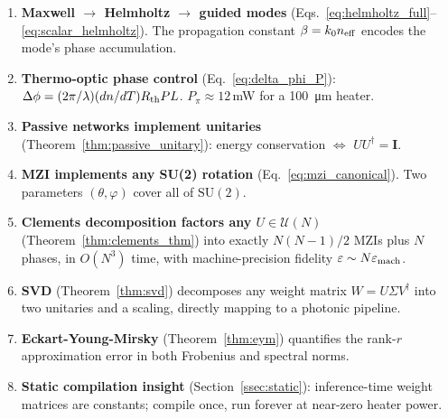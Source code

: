 \documentclass[12pt, a4paper]{article}
\newcommand{\calU}{\mathcal{U}}
\newcommand{\id}{\mathbf{I}}
\begin{document}
\begin{enumerate}
  \item \textbf{Maxwell $\to$ Helmholtz $\to$ guided modes}
    (Eqs.~\eqref{eq:helmholtz_full}--\eqref{eq:scalar_helmholtz}).
    The propagation constant $\beta = k_0 n_{\rm eff}$ encodes the mode's
    phase accumulation.

  \item \textbf{Thermo-optic phase control}
    (Eq.~\eqref{eq:delta_phi_P}):
    $\Delta\phi = (2\pi/\lambda)(dn/dT)R_{\rm th}PL$.
    $P_\pi \approx 12$\,mW for a \SI{100}{\micro\metre} heater.

  \item \textbf{Passive networks implement unitaries}
    (Theorem~\ref{thm:passive_unitary}):
    energy conservation $\Leftrightarrow$ $UU^\dagger = \id$.

  \item \textbf{MZI implements any SU(2) rotation}
    (Eq.~\eqref{eq:mzi_canonical}).
    Two parameters $(\theta,\varphi)$ cover all of $\text{SU}(2)$.

  \item \textbf{Clements decomposition factors any $U\in\calU(N)$}
    (Theorem~\ref{thm:clements_thm})
    into exactly $N(N-1)/2$ MZIs plus $N$ phases, in $O(N^3)$ time,
    with machine-precision fidelity $\varepsilon \sim N\varepsilon_{\rm mach}$.

  \item \textbf{SVD} (Theorem~\ref{thm:svd})
    decomposes any weight matrix $W = U\Sigma V^\dagger$ into two unitaries and
    a scaling, directly mapping to a photonic pipeline.

  \item \textbf{Eckart-Young-Mirsky} (Theorem~\ref{thm:eym})
    quantifies the rank-$r$ approximation error in both Frobenius and spectral
    norms.

  \item \textbf{Static compilation insight}
    (Section~\ref{ssec:static}):
    inference-time weight matrices are constants;
    compile once, run forever at near-zero heater power.
\end{enumerate}
\end{document}
